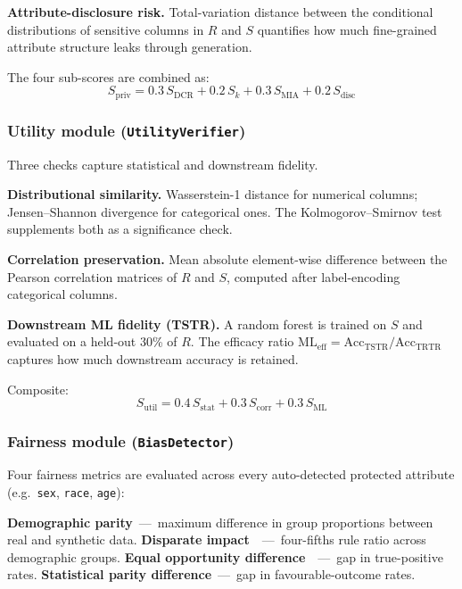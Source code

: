 \textbf{Attribute-disclosure risk.} Total-variation distance between the conditional distributions of sensitive columns in $R$ and $S$ quantifies how much fine-grained attribute structure leaks through generation.

The four sub-scores are combined as:
\begin{equation}
S_{\mathrm{priv}} = 0.3\,S_{\mathrm{DCR}} + 0.2\,S_k + 0.3\,S_{\mathrm{MIA}} + 0.2\,S_{\mathrm{disc}}
\label{eq:privacy_score}
\end{equation}

\subsubsection{Utility module (\texttt{UtilityVerifier})}
Three checks capture statistical and downstream fidelity.

\textbf{Distributional similarity.} Wasserstein-1 distance for numerical columns; Jensen--Shannon divergence for categorical ones. The Kolmogorov--Smirnov test supplements both as a significance check.

\textbf{Correlation preservation.} Mean absolute element-wise difference between the Pearson correlation matrices of $R$ and $S$, computed after label-encoding categorical columns.

\textbf{Downstream ML fidelity (TSTR).} A random forest is trained on $S$ and evaluated on a held-out 30\% of $R$. The efficacy ratio $\mathrm{ML}_{\mathrm{eff}}=\mathrm{Acc}_{\mathrm{TSTR}}/\mathrm{Acc}_{\mathrm{TRTR}}$ captures how much downstream accuracy is retained.

Composite:
\begin{equation}
S_{\mathrm{util}} = 0.4\,S_{\mathrm{stat}} + 0.3\,S_{\mathrm{corr}} + 0.3\,S_{\mathrm{ML}}
\label{eq:utility_score}
\end{equation}

\subsubsection{Fairness module (\texttt{BiasDetector})}
Four fairness metrics are evaluated across every auto-detected protected attribute (e.g.\ \texttt{sex}, \texttt{race}, \texttt{age}):

\textbf{Demographic parity}~---~maximum difference in group proportions between real and synthetic data.
\textbf{Disparate impact}~\cite{feldman2015certifying}~---~four-fifths rule ratio across demographic groups.
\textbf{Equal opportunity difference}~\cite{hardt2016equality}~---~gap in true-positive rates.
\textbf{Statistical parity difference}~---~gap in favourable-outcome rates.

